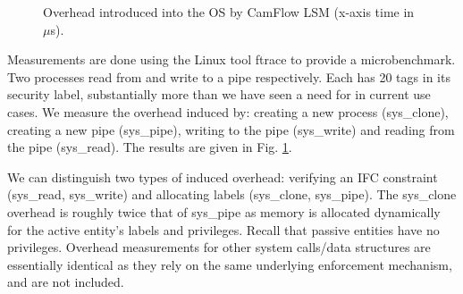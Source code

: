 \documentclass[10pt,journal,compsoc]{IEEEtran}
\begin{document}
\begin{figure}[t]
\centering
{}
  \caption{
  Overhead introduced into the OS by CamFlow LSM (x-axis time in $\mu$s).
    }
  \label{image:os:eval}
\end{figure}

Measurements are done using the Linux tool \textsf{\small ftrace} \cite{bird2009measuring} to provide a microbenchmark. 
Two processes read from and write to a pipe respectively. Each has 20 tags in its security label, substantially more than we have seen a need for in current use cases. We measure the overhead induced by: 
creating a new process (\textsf{\small sys\_clone}), creating a new pipe (\textsf{\small sys\_pipe}), writing to the pipe (\textsf{\small sys\_write}) and reading from the pipe (\textsf{\small sys\_read}). The results are given in Fig. \ref{image:os:eval}.

We can distinguish two types of induced overhead: verifying an IFC constraint (\textsf{\small sys\_read}, \textsf{\small sys\_write}) and allocating labels (\textsf{\small sys\_clone}, \textsf{\small sys\_pipe}).
The \textsf{\small sys\_clone} overhead is roughly twice that of \textsf{\small sys\_pipe} as memory is allocated dynamically for the active entity's labels and privileges. Recall that passive entities have no privileges.  
Overhead measurements for other system calls/data structures 
are essentially identical as they rely on the same underlying enforcement mechanism, and are not included. 
\end{document}
